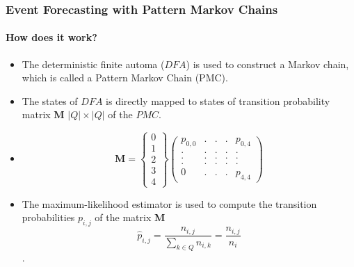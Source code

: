 \frame
{
	\frametitle{Event Forecasting with Pattern Markov
		Chains}
	\framesubtitle{How does it work?}
	\begin{itemize}
		\item<only@1> The  deterministic finite automa ($DFA$) is used to construct a Markov chain, which is called a Pattern Markov Chain (PMC).
		
		
	    \item<only@1> The states of $DFA$ is directly mapped to states of  transition probability matrix $\boldsymbol{M}$  $\lvert Q \rvert \times \lvert Q \rvert$ of the $PMC$.
		
		\item<only@1> 
	\begin{equation*}
	\label{eq:matrix_example}
	\boldsymbol{M} = 
	\begin{Bmatrix} 
	0 \\ 1 \\ 2 \\ 3 \\4
	\end{Bmatrix}
	\begin{pmatrix} 
	p_{0,0}	    &. 		&. 		& . &  	p_{0,4} \\
    . 		    & .		& .	& .	& . \\
	.		    & .		& .		& .	& . \\
	.			& .		& .		& .	& .\\
	0			& .			& .		& .	&p_{4,4}
	\end{pmatrix}
	\end{equation*}
	
	\item<only@1> The maximum-likelihood estimator is used to compute the transition probabilities $p_{i,j}$ of the matrix $\boldsymbol{M}$ 
	\begin{equation}
	\label{eq:pi_estim}
	\hat{p}_{i,j}=\frac{n_{i,j}}{\sum_{k \in Q} n_{i,k}}=\frac{n_{i,j}}{n_{i}}
	\end{equation}. 	
		
	\end{itemize}
}



